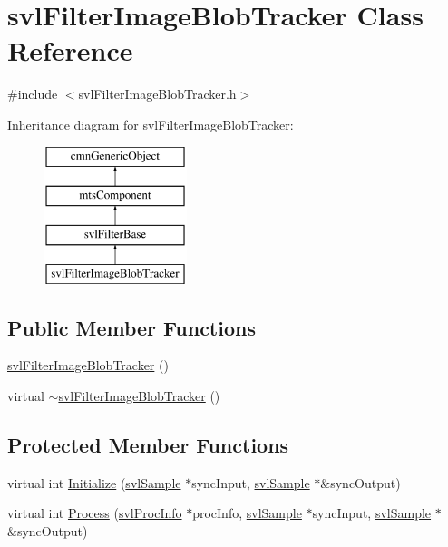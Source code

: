 \hypertarget{classsvl_filter_image_blob_tracker}{\section{svl\-Filter\-Image\-Blob\-Tracker Class Reference}
\label{classsvl_filter_image_blob_tracker}
}


{\ttfamily \#include $<$svl\-Filter\-Image\-Blob\-Tracker.\-h$>$}

Inheritance diagram for svl\-Filter\-Image\-Blob\-Tracker\-:\begin{figure}[H]
\begin{center}
\leavevmode
\includegraphics[height=4.000000cm]{d0/d47/classsvl_filter_image_blob_tracker}
\end{center}
\end{figure}
\subsection*{Public Member Functions}
\begin{DoxyCompactItemize}
\item 
\hyperlink{classsvl_filter_image_blob_tracker_ae7699ad222494a4a1f4e58f10f98f404}{svl\-Filter\-Image\-Blob\-Tracker} ()
\item 
virtual \hyperlink{classsvl_filter_image_blob_tracker_a9de90b7acf4edd7422630719d40a8757}{$\sim$svl\-Filter\-Image\-Blob\-Tracker} ()
\end{DoxyCompactItemize}
\subsection*{Protected Member Functions}
\begin{DoxyCompactItemize}
\item 
virtual int \hyperlink{classsvl_filter_image_blob_tracker_ad0467f76d5d76dd9e7ba1a08d6f78e8e}{Initialize} (\hyperlink{classsvl_sample}{svl\-Sample} $\ast$sync\-Input, \hyperlink{classsvl_sample}{svl\-Sample} $\ast$\&sync\-Output)
\item 
virtual int \hyperlink{classsvl_filter_image_blob_tracker_a14adfd760107886dd8fc723933413522}{Process} (\hyperlink{structsvl_proc_info}{svl\-Proc\-Info} $\ast$proc\-Info, \hyperlink{classsvl_sample}{svl\-Sample} $\ast$sync\-Input, \hyperlink{classsvl_sample}{svl\-Sample} $\ast$\&sync\-Output)
\end{DoxyCompactItemize}
